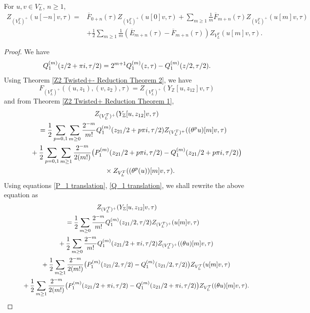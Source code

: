 \documentclass[10pt,a4paper]{amsart}
\begin{document}
\begin{Theorem}\label{+-twisted recursion formulas}
 For $u,v\in V_L^-$, $n\geq 1$,
 \begin{align*}
 Z_{(V_L^T)^+}(u[-n]v,\tau)={}&\overline{F}_{0+n}(\tau)Z_{(V_L^T)^+}(u[0]v,\tau)+\sum_{m\geq 1}\frac{1}{m}\overline{F}_{m+n}(\tau)Z_{(V_L^T)^+}(u[m]v,\tau)\\
 &+\frac{1}{2}\sum_{m\geq 1}\frac{1}{m}\left(\overline{E}_{m+n}(\tau)-\overline{F}_{m+n}(\tau)\right)Z_{V_L^T}(u[m]v, \tau).\end{align*}
\end{Theorem}

\begin{proof}

We have
\begin{equation}\label{Q_1 translation}
 Q_1^{(m)}(z/2+\pi {\rm i},\tau/2)=2^{m+1}Q_1^{(m)}(z,\tau)-Q_1^{(m)}(z/2,\tau/2).
\end{equation}
Using Theorem \ref{Z2 Twisted+- Reduction Theorem 2}, we have
\[F_{(V_L^T)^+}((u,z_1),(v,z_2),\tau)=Z_{(V_L^T)^+}(Y_{\mathbb{Z}}[u,z_{12}]v,\tau)\]
and from Theorem \ref{Z2 Twisted+ Reduction Theorem 1},
\begin{gather*}
Z_{(V_L^T)^+}(Y_{\mathbb{Z}}[u,z_{12}]v,\tau)\\
\qquad=\frac{1}{2}\sum_{p=0,1}\sum_{m\geq 0}\frac{2^{-m}}{m!} Q_1^{(m)}(z_{21}/2+p\pi {\rm i},\tau/2) Z_{(V_L^T)^+}((\theta^pu)[m]v,\tau)\\
\phantom{\qquad=}{}
 +\frac{1}{2}\sum_{p=0,1}\sum_{m\geq 1}\frac{2^{-m}}{2(m!)}\bigl( P_1^{(m)}(z_{21}/2+p\pi {\rm i},\tau/2)-Q_1^{(m)}(z_{21}/2+p\pi {\rm i},\tau/2)\bigr)\\
\phantom{\qquad=+}{}\times Z_{V_L^T}((\theta^p(u))[m]v, \tau).
\end{gather*}
Using equations \eqref{P_1 translation}, \eqref{Q_1 translation}, we shall rewrite the above equation as
\begin{gather*}
Z_{(V_L^T)^+}(Y_{\mathbb{Z}}[u,z_{12}]v,\tau)\\
\qquad=\frac{1}{2}\sum_{m\geq 0}\frac{2^{-m}}{m!} Q_1^{(m)}(z_{21}/2,\tau/2) Z_{(V_L^T)^+}(u[m]v,\tau)\\
\phantom{\qquad=}{}+\frac{1}{2}\sum_{m\geq 0}\frac{2^{-m}}{m!} Q_1^{(m)}(z_{21}/2+\pi {\rm i},\tau/2) Z_{(V_L^T)^+}((\theta u)[m]v,\tau)\\
\phantom{\qquad=}{}+\frac{1}{2}\sum_{m\geq 1}\frac{2^{-m}}{2(m!)}\bigl( P_1^{(m)}(z_{21}/2,\tau/2)-Q_1^{(m)}(z_{21}/2,\tau/2)\bigr)Z_{V_L^T}(u[m]v, \tau)\\
\phantom{\qquad=}{}+\frac{1}{2}\sum_{m\geq 1}\frac{2^{-m}}{2(m!)}\bigl( P_1^{(m)}(z_{21}/2+\pi {\rm i},\tau/2)-Q_1^{(m)}(z_{21}/2+\pi {\rm i},\tau/2)\bigr)Z_{V_L^T}((\theta u)[m]v, \tau).\end{gather*}

\end{proof}
\end{document}
